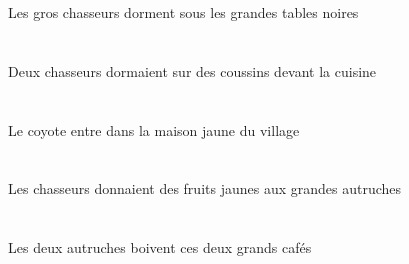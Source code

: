 \begin{exe}
Les gros chasseurs dorment sous les grandes tables noires
\ex\glll
\DEFSgObl{}   \cuisineCSgObl{}   \DEVANT{}   \INDDuAbs{}   \chasseurCDuAbs{}    \INDPlObl{}   \coussinAPlObl{}   \SUR{}  \dormirViPstCDu{}\\
\DEFSgOblP{}   \cuisineCSgOblP{}   \DEVANTP{}   \INDDuAbsP{}   \chasseurCDuAbsP{}    \INDPlOblP{}   \coussinAPlOblP{}   \SURP{}  \dormirViPstCDuP{}\\
\DEFSgOblG{}   \cuisineCSgOblG{}   \DEVANTG{}   \INDDuAbsG{}   \chasseurCDuAbsG{}    \INDPlOblG{}   \coussinAPlOblG{}   \SURG{}  \dormirViPstCDuG{}\\
Deux chasseurs dormaient sur des coussins devant la cuisine
\ex\glll
\DEFSgAbs{}   \coyoteASgAbs{}    \DEFSgObl{}    \DEFSgObl{}   \villageASgObl{}   \DE{}   \jauneDSg{}   \maisonDSgObl{}   \DANS{}  \entrerViPrsASg{}\\
\DEFSgAbsP{}   \coyoteASgAbsP{}    \DEFSgOblP{}    \DEFSgOblP{}   \villageASgOblP{}   \DEP{}   \jauneDSgP{}   \maisonDSgOblP{}   \DANSP{}  \entrerViPrsASgP{}\\
\DEFSgAbsG{}   \coyoteASgAbsG{}    \DEFSgOblG{}    \DEFSgOblG{}   \villageASgOblG{}   \DEG{}   \jauneDSgG{}   \maisonDSgOblG{}   \DANSG{}  \entrerViPrsASgG{}\\
Le coyote entre dans la maison jaune du village
\ex\glll
\DEFPlErg{}   \chasseurCPlErg{}    \DEFPlDat{}   \grandDPl{}   \autrucheDPlDat{}   \INDPlAbs{}   \jauneBPl{}   \fruitBPlAbs{}  \donnerVdPstBPl{}\\
\DEFPlErgP{}   \chasseurCPlErgP{}    \DEFPlDatP{}   \grandDPlP{}   \autrucheDPlDatP{}   \INDPlAbsP{}   \jauneBPlP{}   \fruitBPlAbsP{}  \donnerVdPstBPlP{}\\
\DEFPlErgG{}   \chasseurCPlErgG{}    \DEFPlDatG{}   \grandDPlG{}   \autrucheDPlDatG{}   \INDPlAbsG{}   \jauneBPlG{}   \fruitBPlAbsG{}  \donnerVdPstBPlG{}\\
Les chasseurs donnaient des fruits jaunes aux grandes autruches
\ex\glll
\DEFDuErg{}   \autrucheDDuErg{}   \DEMDuAbs{}   \grandDDu{}   \cafeDDuAbs{}  \boireVtPrsDDu{}\\
\DEFDuErgP{}   \autrucheDDuErgP{}   \DEMDuAbsP{}   \grandDDuP{}   \cafeDDuAbsP{}  \boireVtPrsDDuP{}\\
\DEFDuErgG{}   \autrucheDDuErgG{}   \DEMDuAbsG{}   \grandDDuG{}   \cafeDDuAbsG{}  \boireVtPrsDDuG{}\\
Les deux autruches boivent ces deux grands cafés
\ex\glll
\INDDuErg{}   \autrucheDDuErg{}    \DEMPlDat{}   \maigreAPl{}   \coyoteAPlDat{}   \INDSgAbs{}   \oeufDSgAbs{}  \donnerVdPrsDSg{}\\

\end{exe}
